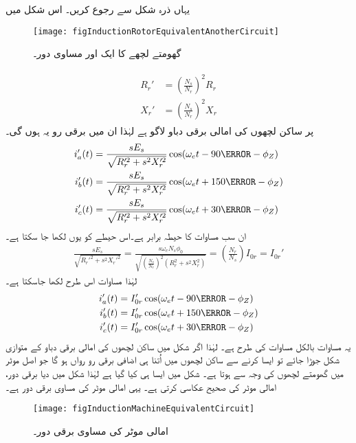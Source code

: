 یہاں ذرہ شکل   سے رجوع کریں۔ اس شکل میں
\begin{figure}
\centering
\texttt{[image: figInductionRotorEquivalentAnotherCircuit]}
\caption{گھومتے لچھے کا ایک اور مساوی دور۔}
\label{شکل_امالی_گھومتے_لچھے_کا_دوسرا_مساوی_دور}
\end{figure}
%
\begin{gather}
\begin{aligned}\label{مساوات_امالی_گھومتے_مزاحمت_امالہ_دوسری_جانب}
R_r'&=\left(\frac{N_s}{N_r} \right)^2 R_r\\
X_r'&=\left(\frac{N_s}{N_r} \right)^2 X_r
\end{aligned}
\end{gather} 
پر ساکن لچھوں کی امالی برقی دباو  لاگو ہے لہٰذا ان میں برقی رو یہ ہوں گی۔
\begin{gather}
\begin{aligned}\label{مساوات_امالی_تین_رو}
i_a'(t)&=\frac{s E_s}{\sqrt{R_r'^2+s^2 X_r'^2}} \cos (\omega_e t -90\degree -\phi_Z)\\
i_b'(t)&=\frac{s E_s}{\sqrt{R_r'^2+s^2 X_r'^2}} \cos (\omega_e t +150\degree -\phi_Z)\\
i_c'(t)&=\frac{s E_s}{\sqrt{R_r'^2+s^2 X_r'^2}} \cos (\omega_e t +30\degree -\phi_Z)
\end{aligned}
\end{gather}
ان سب مساوات کا حیطہ برابر ہے۔اس حیطے کو یوں لکھا جا سکتا ہے۔
\begin{align}\label{مساوات_امالی_رو_دباو_تعلق_الف}
\frac{s E_s}{\sqrt{R_r'^2+s^2 X_r'^2}}=\frac{s \omega_e N_s \phi_0}{\sqrt{\left( \frac{N_s}{N_r}\right)^2 \left(R_r^2+s^2X_r^2 \right)}}=\left(\frac{N_r}{N_s}\right) I_{0r}=I_{0r}'
\end{align}
لہٰذا مساوات   اس طرح لکھا جاسکتا ہے۔
\begin{gather}
\begin{aligned}
i_a'(t)&=I_{0r}' \cos (\omega_e t -90\degree -\phi_Z)\\
i_b'(t)&=I_{0r}' \cos (\omega_e t +150\degree -\phi_Z)\\
i_c'(t)&=I_{0r}' \cos (\omega_e t +30\degree -\phi_Z)
\end{aligned}
\end{gather}
یہ مساوات بالکل مساوات   کی طرح ہے۔ لہٰذا اگر شکل   میں ساکن لچھوں کی امالی برقی دباو  کے متوازی شکل   جوڑا جائے تو ایسا کرنے سے ساکن لچھوں میں اُتنا ہی اضافی برقی رو رواں ہو گا جو اصل موٹر میں گھومتے لچھوں کی وجہ سے ہوتا ہے۔ شکل   میں ایسا ہی کیا گیا ہے لہٰذا شکل میں دیا برقی دور، امالی موٹر کی صحیح عکاسی کرتی ہے۔ یہی امالی موٹر کی مساوی برقی دور ہے۔
\begin{figure}
\centering
\texttt{[image: figInductionMachineEquivalentCircuit]}
\caption{امالی موٹر کی مساوی برقی دور۔}
\label{شکل_امالی_مشین_کا_مکمل_مساوی_دور}
\end{figure}


